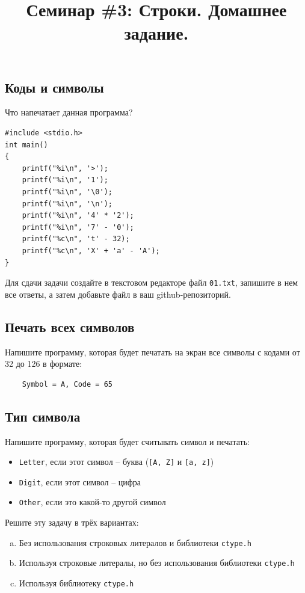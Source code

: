 \documentclass[10pt]{article}
\begin{document}
\title{Семинар \#3: Строки. Домашнее задание.\vspace{-5ex}}\date{}\maketitle

\subsection{Коды и символы}
Что напечатает данная программа?
\begin{lstlisting}
#include <stdio.h>
int main()
{
	printf("%i\n", '>');
	printf("%i\n", '1');
	printf("%i\n", '\0');
	printf("%i\n", '\n');
	printf("%i\n", '4' * '2');
	printf("%i\n", '7' - '0');
	printf("%c\n", 't' - 32);
	printf("%c\n", 'X' + 'a' - 'A');
}
\end{lstlisting}
Для сдачи задачи создайте в текстовом редакторе файл \texttt{01.txt}, запишите в нем все ответы, а затем добавьте файл в ваш github-репозиторий.

\subsection{Печать всех символов}
Напишите программу, которая будет печатать на экран все символы с кодами от 32 до 126 в формате:
\begin{verbatim}
    Symbol = A, Code = 65
\end{verbatim}
                

\subsection{Тип символа}
Напишите программу, которая будет считывать символ и печатать:
\begin{itemize}
\item \texttt{Letter}, если этот символ – буква (\texttt{[A, Z]} и \texttt{[a, z]})
\item \texttt{Digit}, если этот символ – цифра
\item \texttt{Other}, если это какой-то другой символ
\end{itemize}

Решите эту задачу в трёх вариантах:
\begin{enumerate}[(a)]
\item Без использования строковых литералов и библиотеки \texttt{ctype.h}
\item Используя строковые литералы, но без использования библиотеки \texttt{ctype.h}
\item Используя библиотеку \texttt{ctype.h}
\end{enumerate}
\end{document}
